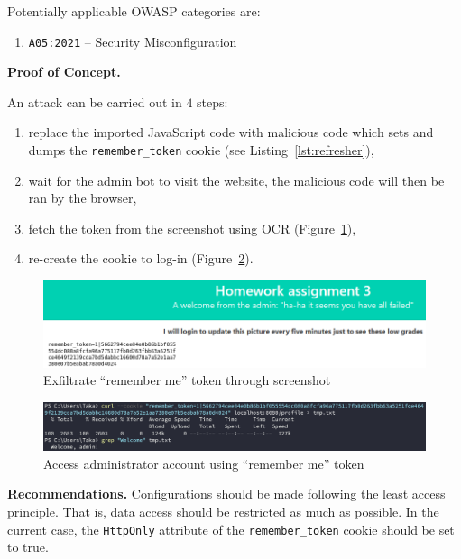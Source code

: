 \documentclass[parskip=half]{scrartcl}
\newcommand{\figref}[1]{Figure~\ref{#1}}
\begin{document}
Potentially applicable OWASP categories are:
\begin{enumerate}
    \item \texttt{A05:2021} -- Security Misconfiguration
\end{enumerate}

\textbf{Proof of Concept.}

An attack can be carried out in $4$ steps:
\begin{enumerate}
    \item replace the imported JavaScript code with malicious
    code which sets and dumps the \texttt{remember\_token} cookie
    (see Listing~\ref{lst:refresher}),
    \item wait for the admin bot to visit the website, the malicious code will
    then be ran by the browser,
    \item fetch the token from the screenshot using OCR
    (\figref{fig:tokendisplay}),
    \item re-create the cookie to log-in (\figref{fig:remhijack}).
\end{enumerate}

\begin{figure}[h]
    \centering
    \includegraphics[width=\textwidth]{token_display}
    \caption{Exfiltrate ``remember me'' token through screenshot}
    \label{fig:tokendisplay}
\end{figure}

\begin{figure}[h]
    \centering
    \includegraphics[width=\textwidth]{remember_hijack}
    \caption{Access administrator account using ``remember me'' token}
    \label{fig:remhijack}
\end{figure}

\textbf{Recommendations.} Configurations should be made following the least
access principle. That is, data access should be restricted as much as
possible. In the current case, the \texttt{HttpOnly} attribute of the
\texttt{remember\_token} cookie should be set to true.
\end{document}
